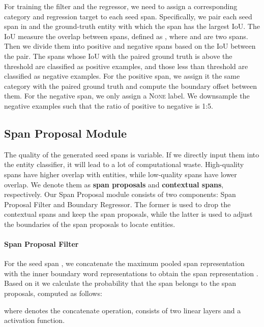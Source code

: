 \documentclass[11pt,a4paper]{article}
\begin{document}
For training the filter and the regressor, we need to assign a corresponding category and regression target to each seed span. Specifically, we pair each seed span in  and the ground-truth entity with which the span has the largest IoU. The IoU measure the overlap between spans, defined as , where  and  are two spans. Then we divide them into positive and negative spans based on the IoU between the pair. The spans whose IoU with the paired ground truth is above the threshold  are classified as positive examples, and those less than threshold  are classified as negative examples. For the positive span, we assign it the same category  with the paired ground truth and compute the boundary offset  between them. For the negative span, we only assign a \textsc{None} label. We downsample the negative examples such that the ratio of positive to negative is 1:5.




\subsection{Span Proposal Module}

The quality of the generated seed spans is variable. If we directly input them into the entity classifier, it will lead to a lot of computational waste. High-quality spans have higher overlap with entities, while low-quality spans have lower overlap. We denote them as \textbf{span proposals} and \textbf{contextual spans}, respectively. Our Span Proposal module consists of two components: Span Proposal Filter and Boundary Regressor. The former is used to drop the contextual spans and keep the span proposals, while the latter is used to adjust the boundaries of the span proposals to locate entities.


\paragraph{Span Proposal Filter}

For the seed span , we concatenate the maximum pooled span representation  with the inner boundary word representations  to obtain the span representation . 
Based on it we calculate the probability  that the span  belongs to the span proposals, computed as follows:







\noindent where  denotes the concatenate operation,  consists of two linear layers and a  \citep{DBLP:journals/corr/HendrycksG16} activation function.
\end{document}
